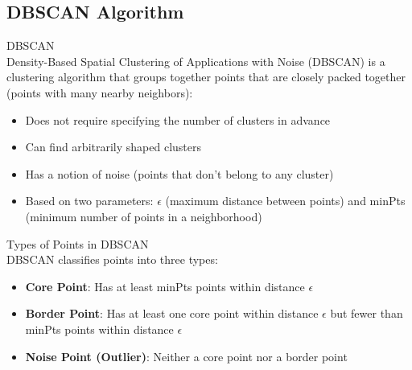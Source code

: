 \subsection{DBSCAN Algorithm}

\begin{definition}{DBSCAN}\\
Density-Based Spatial Clustering of Applications with Noise (DBSCAN) is a clustering algorithm that groups together points that are closely packed together (points with many nearby neighbors):
\begin{itemize}
    \item Does not require specifying the number of clusters in advance
    \item Can find arbitrarily shaped clusters
    \item Has a notion of noise (points that don't belong to any cluster)
    \item Based on two parameters: $\epsilon$ (maximum distance between points) and minPts (minimum number of points in a neighborhood)
\end{itemize}
\end{definition}

\begin{definition}{Types of Points in DBSCAN}\\
DBSCAN classifies points into three types:
\begin{itemize}
    \item \textbf{Core Point}: Has at least minPts points within distance $\epsilon$
    \item \textbf{Border Point}: Has at least one core point within distance $\epsilon$ but fewer than minPts points within distance $\epsilon$
    \item \textbf{Noise Point (Outlier)}: Neither a core point nor a border point
\end{itemize}
\end{definition}

